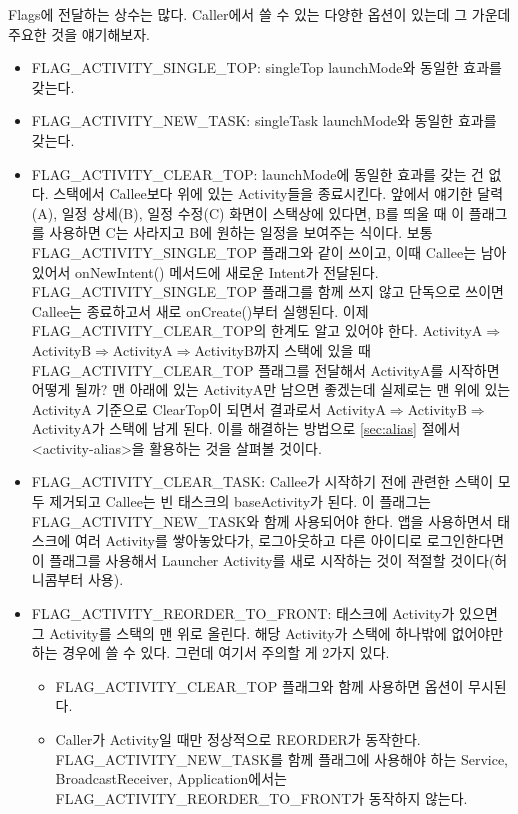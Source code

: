 Flags에 전달하는 상수는 많다. Caller에서 쓸 수 있는 다양한 옵션이 있는데 그 가운데 주요한 것을 얘기해보자.
\begin{itemize}
\item FLAG\_ACTIVITY\_SINGLE\_TOP: singleTop launchMode와 동일한 효과를 갖는다.
\item FLAG\_ACTIVITY\_NEW\_TASK: singleTask launchMode와 동일한 효과를 갖는다.

\item FLAG\_ACTIVITY\_CLEAR\_TOP: launchMode에 동일한 효과를 갖는 건 없다. 스택에서 Callee보다 위에 있는 Activity들을 종료시킨다. 앞에서 얘기한 달력(A), 일정 상세(B), 일정 수정(C) 화면이 스택상에 있다면, B를 띄울 때 이 플래그를 사용하면 C는 사라지고 B에 원하는 일정을 보여주는 식이다. 보통 FLAG\_ACTIVITY\_SINGLE\_TOP 플래그와 같이 쓰이고, 이때 Callee는 남아있어서 onNewIntent() 메서드에 새로운 Intent가 전달된다. FLAG\_ACTIVITY\_SINGLE\_TOP 플래그를 함께 쓰지 않고 단독으로 쓰이면 Callee는 종료하고서 새로 onCreate()부터 실행된다.
이제 FLAG\_ACTIVITY\_CLEAR\_TOP의 한계도 알고 있어야 한다. ActivityA$\Rightarrow$ActivityB$\Rightarrow$Activi\-tyA$\Rightarrow$ActivityB까지 스택에 있을 때 FLAG\_ACTI\-VITY\_CLEAR\_TOP 플래그를 전달해서 ActivityA를 시작하면 어떻게 될까? 맨 아래에 있는 ActivityA만 남으면 좋겠는데 실제로는 맨 위에 있는 ActivityA 기준으로 ClearTop이 되면서 결과로서 ActivityA$\Rightarrow$ActivityB$\Rightarrow$ActivityA가 스택에 남게 된다. 이를 해결하는 방법으로 \ref{sec:alias} 절에서 <activity-alias>을 활용하는 것을 살펴볼 것이다. 

\item FLAG\_ACTIVITY\_CLEAR\_TASK: Callee가 시작하기 전에 관련한 스택이 모두 제거되고 Callee는 빈 태스크의 baseActivity가 된다. 이 플래그는 FLAG\_ACTIVITY\_NEW\_TASK와 함께 사용되어야 한다. 앱을 사용하면서 태스크에 여러 Activity를 쌓아놓았다가, 로그아웃하고 다른 아이디로 로그인한다면 이 플래그를 사용해서 Launcher Activity를 새로 시작하는 것이 적절할 것이다(허니콤부터 사용).
\item FLAG\_ACTIVITY\_REORDER\_TO\_FRONT: 태스크에 Activity가 있으면 그 Activity를 스택의 맨 위로 올린다. 해당 Activity가 스택에 하나밖에 없어야만 하는 경우에 쓸 수 있다.
그런데 여기서 주의할 게 2가지 있다. 
\begin{itemize}
\item FLAG\_ACTIVITY\_CLEAR\_TOP 플래그와 함께 사용하면 옵션이 무시된다. 
\item Caller가 Activity일 때만 정상적으로 REORDER가 동작한다. FLAG\_ACTIVITY\_NEW\_TASK를 함께 플래그에 사용해야 하는 Service, BroadcastReceiver, Application에서는 FLAG\_ACTIVI\-TY\_RE\-ORDER\_TO\_FRONT가 동작하지 않는다.
\end{itemize}
\end{itemize}


